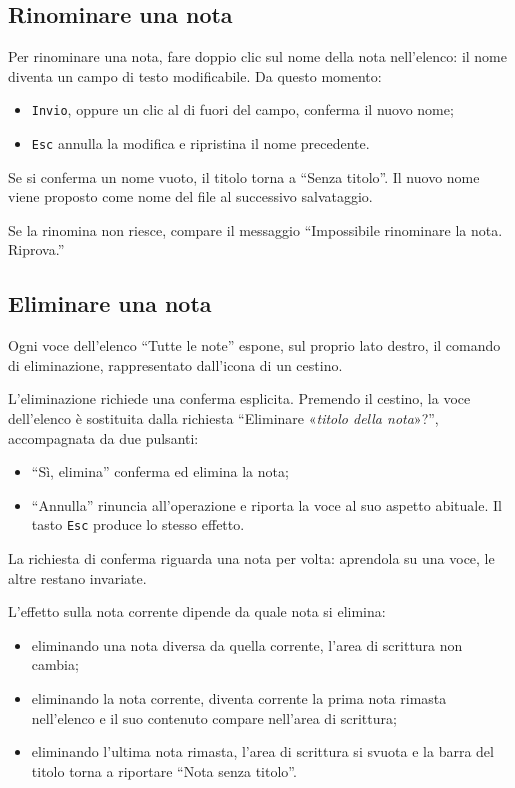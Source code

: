 \documentclass[a4paper, 10pt]{article}
\begin{document}
\subsection{Rinominare una nota}
\label{sec:rinominare-nota}
Per rinominare una nota, fare doppio clic sul nome della nota nell'elenco: il nome diventa un campo di testo modificabile. Da questo momento:

\begin{itemize}
    \item \texttt{Invio}, oppure un clic al di fuori del campo, conferma il nuovo nome;

    \item \texttt{Esc} annulla la modifica e ripristina il nome precedente.
\end{itemize}

Se si conferma un nome vuoto, il titolo torna a ``Senza titolo''. Il nuovo nome viene proposto come nome del file al successivo salvataggio.

Se la rinomina non riesce, compare il messaggio ``Impossibile rinominare la nota. Riprova.''

\subsection{Eliminare una nota}
\label{sec:eliminare-nota}
Ogni voce dell'elenco ``Tutte le note'' espone, sul proprio lato destro, il comando di eliminazione, rappresentato dall'icona di un cestino.

L'eliminazione richiede una conferma esplicita. Premendo il cestino, la voce dell'elenco è sostituita dalla richiesta ``Eliminare «\textit{titolo della nota}»?'', accompagnata da due pulsanti:

\begin{itemize}
    \item ``Sì, elimina'' conferma ed elimina la nota;

    \item ``Annulla'' rinuncia all'operazione e riporta la voce al suo aspetto abituale. Il tasto \texttt{Esc} produce lo stesso effetto.
\end{itemize}

La richiesta di conferma riguarda una nota per volta: aprendola su una voce, le altre restano invariate.

L'effetto sulla nota corrente dipende da quale nota si elimina:

\begin{itemize}
    \item eliminando una nota diversa da quella corrente, l'area di scrittura non cambia;

    \item eliminando la nota corrente, diventa corrente la prima nota rimasta nell'elenco e il suo contenuto compare nell'area di scrittura;

    \item eliminando l'ultima nota rimasta, l'area di scrittura si svuota e la barra del titolo torna a riportare ``Nota senza titolo''.
\end{itemize}
\end{document}
